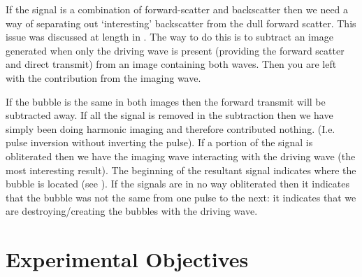 If the signal is a combination of forward-scatter and backscatter then we need a way of separating out `interesting' backscatter from the dull forward scatter.
This issue was discussed at length in .
The way to do this is to subtract an image generated when only the driving wave is present (providing the forward scatter and direct transmit)
from an image containing both waves.
Then you are left with the contribution from the imaging wave.

If the bubble is the same in both images then the forward transmit will be subtracted away.
If all the signal is removed in the subtraction then we have simply been doing harmonic imaging and therefore contributed nothing.
(I.e. pulse inversion without inverting the pulse).
If a portion of the signal is obliterated then we have the imaging wave interacting with the driving wave (the most interesting result).
The beginning of the resultant signal indicates where the bubble is located (see ).
If the signals are in no way obliterated then it indicates that the bubble was not the same from one pulse to the next:
it indicates that we are destroying/creating the bubbles with the driving wave.





\section{Experimental Objectives} \label{sec:WE:objectives}



